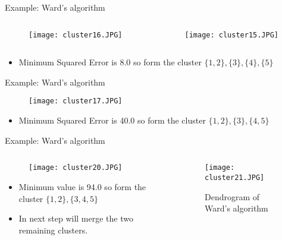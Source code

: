 \begin{frame}{Example: Ward's algorithm}
\vspace{-0.5cm}
\begin{columns}
\begin{column}{3cm}
\begin{figure}
\texttt{[image: cluster16.JPG]}
\end{figure}
\end{column}
\begin{column}{6.5cm}
\begin{figure}
\texttt{[image: cluster15.JPG]}
\end{figure}
\end{column}
\end{columns}
\vspace{12pt}
\begin{itemize}
\item Minimum Squared Error is 8.0 so form the cluster $\{1,2\},\{3\},\{4\},\{5\}$
\end{itemize}
\end{frame}

\begin{frame}{Example: Ward's algorithm}
\begin{figure}
\texttt{[image: cluster17.JPG]}
\end{figure}
\begin{itemize}
\item Minimum Squared Error is 40.0 so form the cluster $\{1,2\},\{3\},\{4,5\}$
\end{itemize}
\end{frame}

\begin{frame}{Example: Ward's algorithm}
\begin{columns}
\begin{column}{5cm}
\begin{figure}
\texttt{[image: cluster20.JPG]}
\end{figure}
\begin{itemize}
\item Minimum value is 94.0 so form the cluster $\{1,2\},\{3,4,5\}$
\item In next step will merge the two remaining clusters.
\end{itemize}
\end{column}
\begin{column}{5.5cm}
\begin{figure}
\texttt{[image: cluster21.JPG]}
\caption{Dendrogram of Ward's algorithm}
\end{figure}
\end{column}
\end{columns}
\end{frame}


